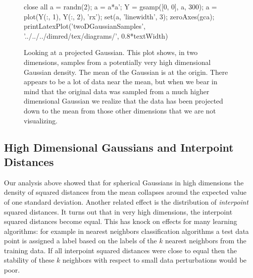 \begin{figure}
  \begin{matlab}
    close all
    a = randn(2);
    a = a*a';
    Y = gsamp([0, 0], a, 300);
    a = plot(Y(:, 1), Y(:, 2), 'rx');
    set(a, 'linewidth', 3);
    zeroAxes(gca);
    printLatexPlot('twoDGaussianSamples', '../../../dimred/tex/diagrams/', 0.8*textWidth)
  \end{matlab}
  \begin{center}
  \end{center}

  \caption{Looking at a projected Gaussian. This plot shows, in two
    dimensions, samples from a potentially very high dimensional
    Gaussian density. The mean of the Gaussian is at the origin. There
    appears to be a lot of data near the mean, but when we bear in
    mind that the original data was sampled from a much higher
    dimensional Gaussian we realize that the data has been projected
    down to the mean from those other dimensions that we are not
    visualizing.}\label{fig:projectedGaussian}
\end{figure}

\subsection{High Dimensional Gaussians and Interpoint Distances}

Our analysis above showed that for spherical Gaussians in high
dimensions the density of squared distances from the mean collapses
around the expected value of one standard deviation. Another related
effect is the distribution of \emph{interpoint} squared distances. It
turns out that in very high dimensions, the interpoint squared
distances become equal. This has knock on effects for many learning
algorithms: for example in nearest neighbors classification algorithms a test data point is assigned
a label based on the labels of the $k$ nearest neighbors from the
training data. If all interpoint squared distances were close to equal
then the stability of these $k$ neighbors with respect to small data
perturbations would be poor.

